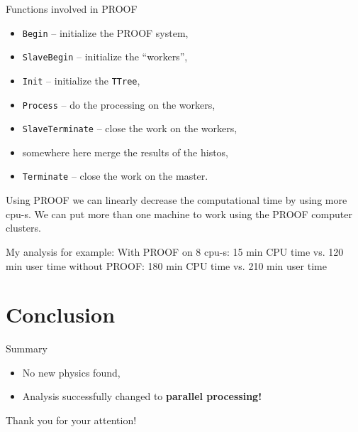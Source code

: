 \documentclass{beamer}
\begin{document}
\begin{frame}[t]{Functions involved in PROOF}
	\begin{itemize}
		\item{{\tt Begin} -- initialize the PROOF system,}
		\item{{\tt SlaveBegin} -- initialize the ``workers'',}
		\item{{\tt Init} -- initialize the {\tt TTree},}
		\item{{\tt Process} -- do the processing on the workers,}
		\item{{\tt SlaveTerminate} -- close the work on the workers,}
		\item{somewhere here merge the results of the histos,}
		\item{{\tt Terminate} -- close the work on the master.}
	\end{itemize}

	Using PROOF we can linearly decrease the computational time by using more cpu-s. We can put more
	than one machine to work using the PROOF computer clusters.

	My analysis for example:
	With PROOF on 8 cpu-s: 15 min CPU time vs. 120 min user time
	without PROOF: 180 min CPU time vs. 210 min user time 
\end{frame}

\section{Conclusion}
\begin{frame}[t]{Summary}
	\begin{itemize}
		\item{No new physics found,}
		\item{Analysis successfully changed to {\bf parallel processing!}}
	\end{itemize}
\end{frame}

\begin{frame}
	Thank you for your attention!
\end{frame}
\end{document}
